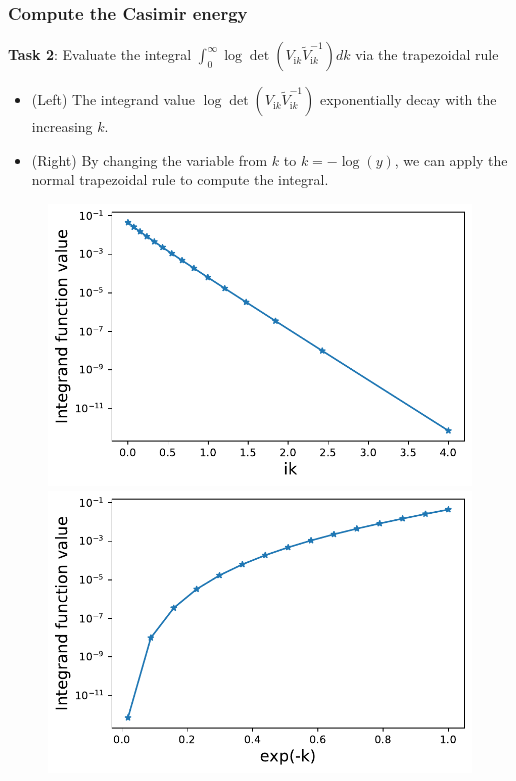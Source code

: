 \documentclass[dvipsnames,10pt]{beamer}
\begin{document}
\begin{frame}
    \frametitle{Compute the Casimir energy}
    \textbf{Task 2}: Evaluate the integral $\int_{0}^{\infty}\log\det\left(V_{\mathrm{i}k}\tilde{V}_{\mathrm{i}k}^{-1}\right)dk$ via the trapezoidal rule
    
    \begin{itemize}
        \item (Left) The integrand value $\log\det\left(V_{\mathrm{i}k}\tilde{V}_{\mathrm{i}k}^{-1}\right)$ exponentially decay with the increasing $k$.
        \item (Right) By changing the variable from $k$ to $k = -\log(y)$, we can apply the normal trapezoidal rule to compute the integral.
    \end{itemize}
    
\begin{figure}[H]
    \begin{minipage}[b]{.47\textwidth}
    \centering
    \includegraphics[width=1\textwidth]{figs/integ_exp_decay.pdf}
    \end{minipage}
    \hfill
    \begin{minipage}[b]{.47\textwidth}
    \centering
    \includegraphics[width=1\textwidth]{figs/integ_exp_not_decay.pdf}
    \end{minipage}
    \end{figure}


\end{frame}
\end{document}
